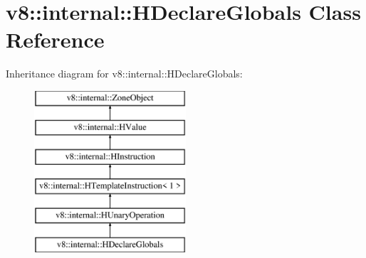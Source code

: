 \hypertarget{classv8_1_1internal_1_1_h_declare_globals}{}\section{v8\+:\+:internal\+:\+:H\+Declare\+Globals Class Reference}
\label{classv8_1_1internal_1_1_h_declare_globals}
Inheritance diagram for v8\+:\+:internal\+:\+:H\+Declare\+Globals\+:\begin{figure}[H]
\begin{center}
\leavevmode
\includegraphics[height=6.000000cm]{classv8_1_1internal_1_1_h_declare_globals}
\end{center}
\end{figure}

